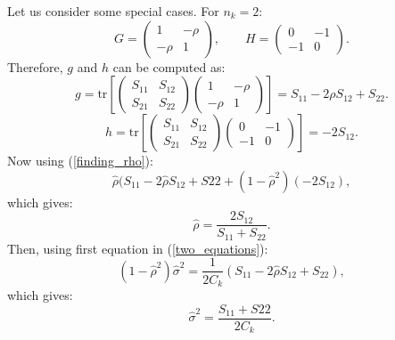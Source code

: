\documentclass[11pt,a5paper,twoside]{book}
\begin{document}
{Let us consider some special cases. For $n_k=2$:
\begin{equation*}
\label{n_2_1}
G=
 \begin{pmatrix}
  1 & -\rho\\
 - \rho & 1
 \end{pmatrix},\qquad H=
  \begin{pmatrix}
  0 & -1\\
  -1 & 0
 \end{pmatrix}.
\end{equation*}
Therefore, $g$ and $h$ can be computed as:
\begin{equation*}
g=\mathrm{tr}\left[ \begin{pmatrix}
S_{11} & S_{12} \\
S_{21} & S_{22}
\end{pmatrix}\begin{pmatrix}
1 & -\rho \\
-\rho & 1
\end{pmatrix} \right ] = S_{11} - 2\rho S_{12} + S_{22}.
\end{equation*}
\begin{equation*}
h=\mathrm{tr}\left[ \begin{pmatrix}
S_{11} & S_{12} \\
S_{21} & S_{22}
\end{pmatrix}\begin{pmatrix}
0 & -1 \\
-1 & 0
\end{pmatrix} \right ] = -2S_{12}.
\end{equation*}
Now using (\ref{finding_rho}):
$$\widehat{\rho}(S_{11}- 2\widehat{\rho}S_{12}+S{22}+(1-\widehat{\rho}^2)(-2S_{12}),$$
which gives:
\begin{equation}
\label{n2_hat_rho}
\widehat{\rho}=\frac{2S_{12}}{S_{11}+S_{22}}.
\end{equation}
Then, using first equation in (\ref{two_equations}):
$$(1-\widehat{\rho}^2)\widehat{\sigma}^2 = \frac{1}{2C_k}(S_{11}-2\widehat{\rho}S_{12} + S_{22}),$$
which gives:
\begin{equation}
\label{n2_hat_sigma2}
\widehat{\sigma}^2=\frac{S_{11}+S{22}}{2C_k}.
\end{equation}

}
\end{document}
